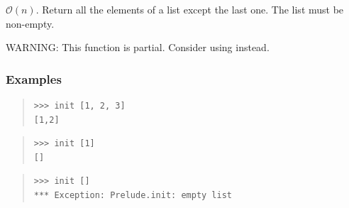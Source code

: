 \begin{haddockdesc}
\item[\begin{tabular}{@{}l}
init :: HasCallStack => {\char 91}a{\char 93} -> {\char 91}a{\char 93}
\end{tabular}]
{\haddockbegindoc
\(\mathcal{O}(n)\). Return all the elements of a list except the last one.
 The list must be non-empty.\par
WARNING: This function is partial. Consider using  instead.\par
\subsubsection*{\textbf{Examples}}
\begin{quote}
{\haddockverb\begin{verbatim}
>>> init [1, 2, 3]
[1,2]

\end{verbatim}}
\end{quote}
\begin{quote}
{\haddockverb\begin{verbatim}
>>> init [1]
[]

\end{verbatim}}
\end{quote}
\begin{quote}
{\haddockverb\begin{verbatim}
>>> init []
*** Exception: Prelude.init: empty list

\end{verbatim}}
\end{quote}}
\end{haddockdesc}
